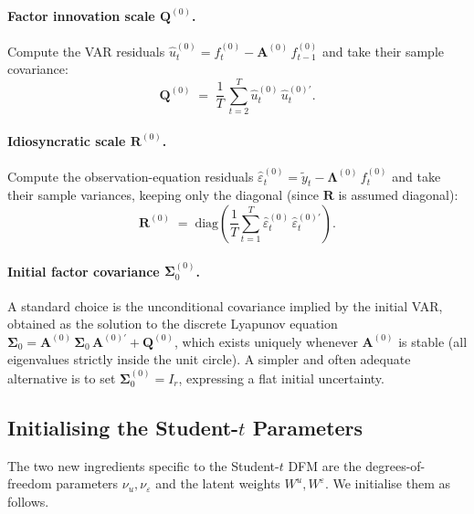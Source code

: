 \documentclass[11pt, a4paper, oneside]{article}
\newcommand{\mL}{\boldsymbol{\Lambda}}
\begin{document}
\paragraph{Factor innovation scale $\mathbf{Q}^{(0)}$.}
Compute the VAR residuals
$\hat{u}^{(0)}_t = f^{(0)}_t - \mathbf{A}^{(0)}\,f^{(0)}_{t-1}$ and
take their sample covariance:
\begin{equation}
\mathbf{Q}^{(0)} \;=\; \frac{1}{T}\,\sum_{t=2}^{T} \hat{u}^{(0)}_t\, \hat{u}^{(0)\prime}_t.
\label{eq:init-Q}
\end{equation}

\paragraph{Idiosyncratic scale $\mathbf{R}^{(0)}$.}
Compute the observation-equation residuals
$\hat{\varepsilon}^{(0)}_t = \tilde{y}_t - {\mL}^{(0)}\,f^{(0)}_t$
and take their sample variances, keeping only the diagonal (since
$\mathbf{R}$ is assumed diagonal):
\begin{equation}
\mathbf{R}^{(0)} \;=\; \mathrm{diag}\!\left(\frac{1}{T}\sum_{t=1}^{T} \hat{\varepsilon}^{(0)}_t\, \hat{\varepsilon}^{(0)\prime}_t\right).
\label{eq:init-R}
\end{equation}

\paragraph{Initial factor covariance $\boldsymbol{\Sigma}_0^{(0)}$.}
A standard choice is the unconditional covariance implied by the
initial VAR, obtained as the solution to the discrete Lyapunov equation
$\boldsymbol{\Sigma}_0 = \mathbf{A}^{(0)}\,\boldsymbol{\Sigma}_0\,\mathbf{A}^{(0)\prime} + \mathbf{Q}^{(0)}$,
which exists uniquely whenever $\mathbf{A}^{(0)}$ is stable (all
eigenvalues strictly inside the unit circle). A simpler and often
adequate alternative is to set $\boldsymbol{\Sigma}_0^{(0)} = I_r$,
expressing a flat initial uncertainty.

\subsection{Initialising the Student-$t$ Parameters}

The two new ingredients specific to the Student-$t$ DFM are the
degrees-of-freedom parameters $\nu_u, \nu_\varepsilon$ and the latent
weights $W^u, W^\varepsilon$. We initialise them as follows.
\end{document}
